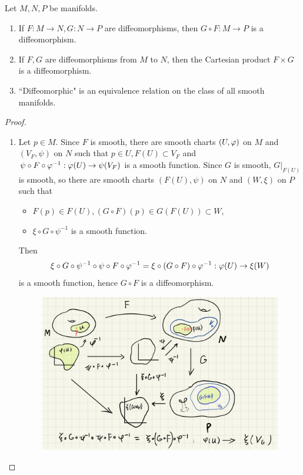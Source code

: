 \begin{proposition}
Let $M,N,P$ be manifolds. 
    \begin{enumerate}
        \item If $F: M \to N, G: N \to P$ are diffeomorphisms, then $G \circ F:M \to P$ is a diffeomorphism. 
        \item If $F, G$ are diffeomorphisms from $M$ to $N$, 
        then the Cartesian product $F \times G$ is a diffeomorphism. 
        \item ``Diffeomorphic" is an equivalence relation on the class of all smooth manifolds. 
    \end{enumerate}
\end{proposition}
\begin{proof}
    \begin{enumerate}
    \item Let $p \in M$. Since $F$ is smooth, there are smooth charts $(U, \varphi)$ on $M$ and $(V_F, \psi)$ on $N$ such that $p \in U, F(U) \subset V_F$ and $\psi \circ F \circ \varphi^{-1}:\varphi(U) \to \psi(V_F)$ is a smooth function. 
    Since $G$ is smooth, $G|_{F(U)}$ is smooth, so there are smooth charts $(F(U), \psi)$ on $N$ and $(W, \xi)$ on $P$ such that 
    \begin{itemize}
        \item $F(p) \in F(U), (G \circ F) (p) \in G(F(U)) \subset W$, 
        \item $\xi \circ G \circ \psi^{-1}$ is a smooth function. 
    \end{itemize}
    Then 
    $$\xi \circ G \circ \psi^{-1} \circ \psi \circ F \circ \varphi^{-1} 
      = \xi \circ (G \circ F) \circ \varphi^{-1} : \varphi(U) \to \xi(W) $$
    is a smooth function, hence $G \circ F$ is a diffeomorphism. 
    \begin{figure}[h]
        \centering
        \includegraphics[scale=0.2]{figure/Lee2.15.jpeg}
    \end{figure}
    

\end{enumerate}
\end{proof}
